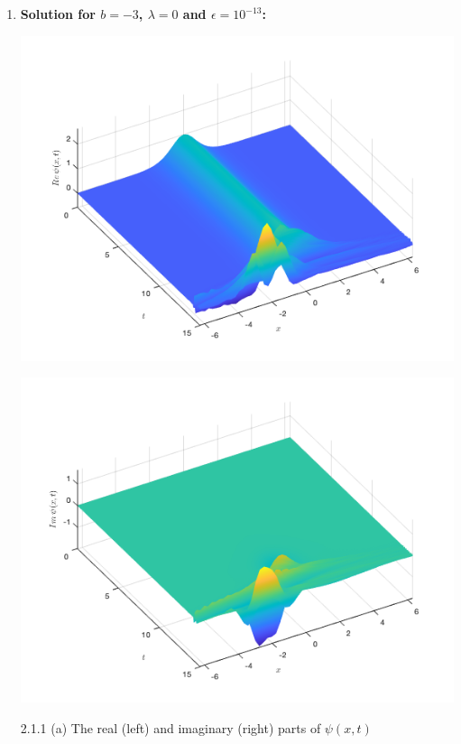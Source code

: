 \documentclass[12pt, letterpaper, twoside]{article}
\begin{document}
\begin{enumerate}[label=(\roman*)]
\item \textbf{Solution for $b = -3$, $\lambda=0$ and $\epsilon = 10^{-13}$:}
\begin{multicols}{2}
\begin{center}
    \includegraphics[scale=0.35]{Figures/(b-3real).png}
\end{center}
\begin{center}
    \includegraphics[scale=0.35]{Figures/(b-3imag).png}
\end{center}
\end{multicols}
\figurename{ 2.1.1 (a) The real (left) and imaginary (right) parts of $\psi(x, t)$}



\end{enumerate}
\end{document}
